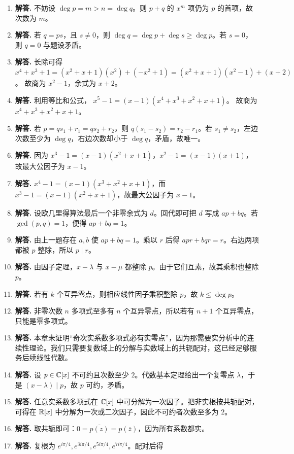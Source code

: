 \begin{enumerate}[label=\textbf{\arabic*.}, leftmargin=*, itemsep=1em]
\item \textbf{解答.} 不妨设 $\deg p=m>n=\deg q$。则 $p+q$ 的 $x^m$ 项仍为 $p$ 的首项，故次数为 $m$。
\item \textbf{解答.} 若 $q=ps$，且 $s\neq 0$，则 $\deg q=\deg p+\deg s\ge \deg p$。若 $s=0$，则 $q=0$ 与题设矛盾。
\item \textbf{解答.} 长除可得
$x^4+x^3+1=(x^2+x+1)(x^2)+(-x^2+1)=(x^2+x+1)(x^2-1)+(x+2)$。
故商为 $x^2-1$，余式为 $x+2$。
\item \textbf{解答.} 利用等比和公式，
$x^5-1=(x-1)(x^4+x^3+x^2+x+1)$。
故商为 $x^4+x^3+x^2+x+1$。
\item \textbf{解答.} 若 $p=qs_1+r_1=qs_2+r_2$，则 $q(s_1-s_2)=r_2-r_1$。若 $s_1\neq s_2$，左边次数至少为 $\deg q$，右边次数却小于 $\deg q$，矛盾，故唯一。
\item \textbf{解答.} 因为 $x^3-1=(x-1)(x^2+x+1)$，$x^2-1=(x-1)(x+1)$，故最大公因子为 $x-1$。
\item \textbf{解答.} $x^4-1=(x-1)(x^3+x^2+x+1)$，而 $x^3-1=(x-1)(x^2+x+1)$，故最大公因子为 $x-1$。
\item \textbf{解答.} 设欧几里得算法最后一个非零余式为 $d$。回代即可把 $d$ 写成 $ap+bq$。若 $\gcd(p,q)=1$，便得 $ap+bq=1$。
\item \textbf{解答.} 由上一题存在 $a,b$ 使 $ap+bq=1$。乘以 $r$ 后得 $apr+bqr=r$。右边两项都被 $p$ 整除，所以 $p\mid r$。
\item \textbf{解答.} 由因子定理，$x-\lambda$ 与 $x-\mu$ 都整除 $p$。由于它们互素，故其乘积也整除 $p$。
\item \textbf{解答.} 若有 $k$ 个互异零点，则相应线性因子乘积整除 $p$，故 $k\le\deg p$。
\item \textbf{解答.} 非零次数 $n$ 多项式至多有 $n$ 个互异零点，所以若有 $n+1$ 个互异零点，只能是零多项式。
\item \textbf{解答.} 本章未证明“奇次实系数多项式必有实零点”，因为那需要实分析中的连续性理论。我们只需要复数域上的分解与实数域上的共轭配对，这已经足够服务后续线性代数。
\item \textbf{解答.} 设 $p\in\mathbb{C}[x]$ 不可约且次数至少 $2$。代数基本定理给出一个复零点 $\lambda$，于是 $(x-\lambda)\mid p$，故 $p$ 可约，矛盾。
\item \textbf{解答.} 任意实系数多项式在 $\mathbb{C}[x]$ 中可分解为一次因子。把非实根按共轭配对，可得在 $\mathbb{R}[x]$ 中分解为一次或二次因子，因此不可约者次数至多为 $2$。
\item \textbf{解答.} 取共轭即可：$0=\overline{p(z)}=p(\overline z)$，因为所有系数都实。
\item \textbf{解答.} 复根为 $e^{i\pi/4},e^{3i\pi/4},e^{5i\pi/4},e^{7i\pi/4}$。配对后得

\end{enumerate}
